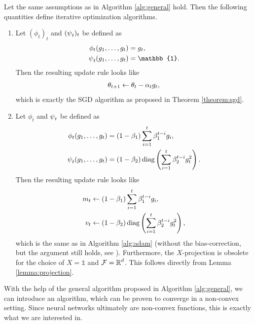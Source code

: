 \begin{example}
Let the same assumptions as in Algorithm \ref{alg:general} hold. Then the following quantities define iterative optimization algorithms.
\begin{enumerate}
\item Let $(\phi_t)_t$ and $(\operatorname{\psi}_t)_t$ be defined as
\begin{align*}
\phi_t(g_1,\ldots, g_t) &= g_t,\\
\p_t(g_1,\ldots, g_t) &= \mathbb{1}.
\end{align*}
Then the resulting update rule looks like
\begin{align*}
\theta_{t+1} \gets \theta_t - \alpha_t g_t,
\end{align*}
which is exactly the SGD algorithm as proposed in Theorem \ref{theorem:sgd}.
\item Let $\phi_t$ and $\operatorname{\psi}_t$ be defined as
\begin{align*}
\phi_t(g_1,\ldots, g_t) &= (1-\beta_1)\sum_{i=1}^t\beta_1^{t-i}g_i,\\
\operatorname{\psi}_t(g_1,\ldots, g_t) &= (1-\beta_2)\operatorname{\text{diag}}\left(\sum_{i=1}^t\beta_2^{t-i}g_t^2\right).
\end{align*}
Then the resulting update rule looks like
\begin{align*}
m_t &\gets (1-\beta_1)\sum_{i=1}^t\beta_1^{t-i}g_i,\\
v_t &\gets (1-\beta_2)\operatorname{\text{diag}}\left(\sum_{i=1}^t\beta_2^{t-i}g_t^2\right),
\end{align*}
which is the same as in Algorithm \ref{alg:adam} (without the bias-correction, but the argument still holds, see \cite{reddi2019convergence}). Furthermore, the $X$-projection is obsolete for the choice of $X=\mathbb{1}$ and $\operatorname{\mathcal{F}}=\operatorname{\mathbb{R}}^d$. This follows directly from Lemma \ref{lemma:projection}.
\end{enumerate}
\end{example}

With the help of the general algorithm proposed in Algorithm \ref{alg:general}, we can introduce an algorithm, which can be proven to converge in a non-convex setting. Since neural networks ultimately are non-convex functions, this is exactly what we are interested in.

